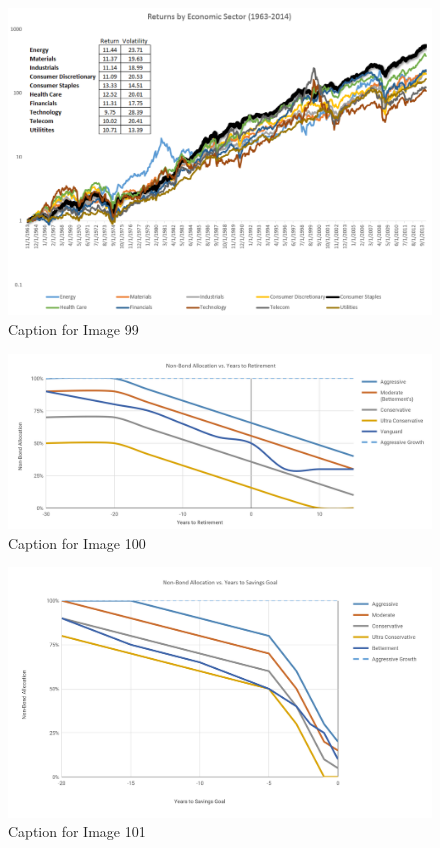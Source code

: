 \documentclass{article}
\begin{document}
\begin{figure}[!htb]
    \centering
    \includegraphics[width=\textwidth]{imgs/99.png}
    \caption{Caption for Image 99}
\end{figure}

\vspace{10pt}

\begin{figure}[!htb]
    \centering
    \includegraphics[width=\textwidth]{imgs/100.png}
    \caption{Caption for Image 100}
\end{figure}

\vspace{10pt}

\begin{figure}[!htb]
    \centering
    \includegraphics[width=\textwidth]{imgs/101.png}
    \caption{Caption for Image 101}
\end{figure}
\end{document}
